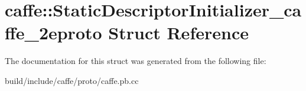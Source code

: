 \hypertarget{structcaffe_1_1_static_descriptor_initializer__caffe__2eproto}{}\section{caffe\+:\+:Static\+Descriptor\+Initializer\+\_\+caffe\+\_\+2eproto Struct Reference}
\label{structcaffe_1_1_static_descriptor_initializer__caffe__2eproto}


The documentation for this struct was generated from the following file\+:\begin{DoxyCompactItemize}
\item 
build/include/caffe/proto/caffe.\+pb.\+cc\end{DoxyCompactItemize}
